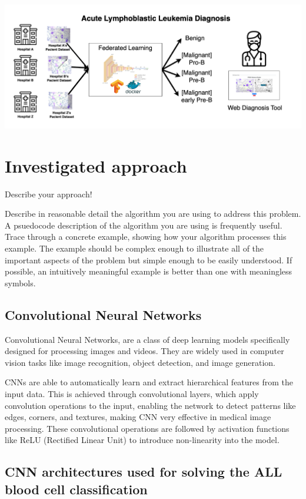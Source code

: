 \documentclass[runningheads,a4paper,11pt]{report}
\begin{document}
\includegraphics[scale=0.25]{images/diagram.png}


\chapter{Investigated approach}
\label{chapter:proposedApproach}

Describe your approach!

Describe in reasonable detail the algorithm you are using to address this problem. A psuedocode description of the algorithm you are using is frequently useful. Trace through a concrete example, showing how your algorithm processes this example. The example should be complex enough to illustrate all of the important aspects of the problem but simple enough to be easily understood. If possible, an intuitively meaningful example is better than one with meaningless symbols.

\section{Convolutional Neural Networks}

Convolutional Neural Networks, are a class of deep learning models specifically designed for processing images and videos. They are widely used in computer vision tasks like image recognition, object detection, and image generation. 

CNNs are able to automatically learn and extract hierarchical features from the input data. This is achieved through convolutional layers, which apply convolution operations to the input, enabling the network to detect patterns like edges, corners, and textures, making CNN very effective in medical image processing. These convolutional operations are followed by activation functions like ReLU (Rectified Linear Unit) to introduce non-linearity into the model.

\section{CNN architectures used for solving the ALL blood cell classification}
\end{document}
